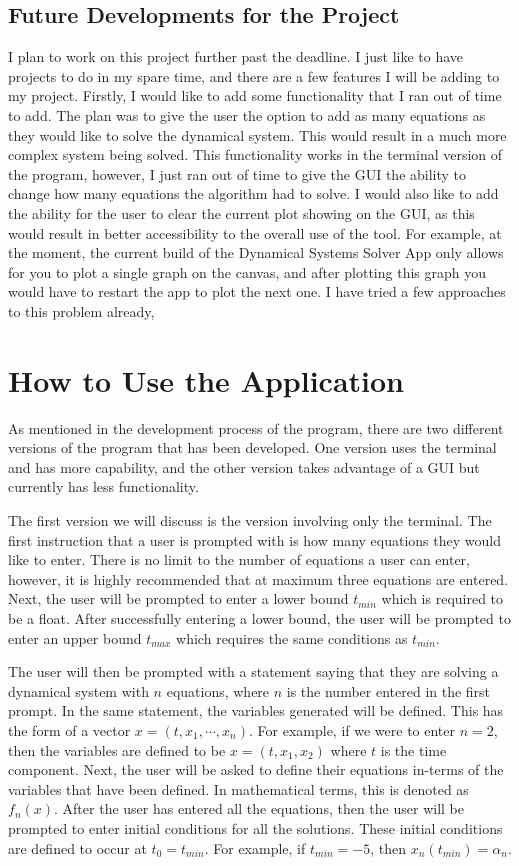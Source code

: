 \documentclass[12pt]{report}
\begin{document}
\section{Future Developments for the Project}
I plan to work on this project further past the deadline. I just like to have projects to do in my spare time, and there are a few features I will be adding to my project. Firstly, I would like to add some functionality that I ran out of time to add. The plan was to give the user the option to add as many equations as they would like to solve the dynamical system. This would result in a much more complex system being solved. This functionality works in the terminal version of the program, however, I just ran out of time to give the GUI the ability to change how many equations the algorithm had to solve. I would also like to add the ability for the user to clear the current plot showing on the GUI, as this would result in better accessibility to the overall use of the tool. For example, at the moment, the current build of the Dynamical Systems Solver App only allows for you to plot a single graph on the canvas, and after plotting this graph you would have to restart the app to plot the next one. I have tried a few approaches to this problem already,
\chapter{How to Use the Application}
As mentioned in the development process of the program, there are two different versions of the program that has been developed. One version uses the terminal and has more capability, and the other version takes advantage of a GUI but currently has less functionality.
\smallskip

The first version we will discuss is the version involving only the terminal. The first instruction that a user is prompted with is how many equations they would like to enter. There is no limit to the number of equations a user can enter, however, it is highly recommended that at maximum three equations are entered. Next, the user will be prompted to enter a lower bound $t_{min}$ which is required to be a float. After successfully entering a lower bound, the user will be prompted to enter an upper bound $t_{max}$ which requires the same conditions as $t_{min}$.
\smallskip

The user will then be prompted with a statement saying that they are solving a dynamical system with $n$ equations, where $n$ is the number entered in the first prompt. In the same statement, the variables generated will be defined. This has the form of a vector $x = (t,x_{1},\cdots, x_{n})$. For example, if we were to enter $n = 2$, then the variables are defined to be $x = (t,x_{1},x_{2})$ where $t$ is the time component. Next, the user will be asked to define their equations in-terms of the variables that have been defined. In mathematical terms, this is denoted as $f_{n}(x)$. After the user has entered all the equations, then the user will be prompted to enter initial conditions for all the solutions. These initial conditions are defined to occur at $t_{0} = t_{min}$. For example, if $t_{min} = -5$, then $x_{n}\left(t_{min}\right) = \alpha_{n}$.
\smallskip
\end{document}
